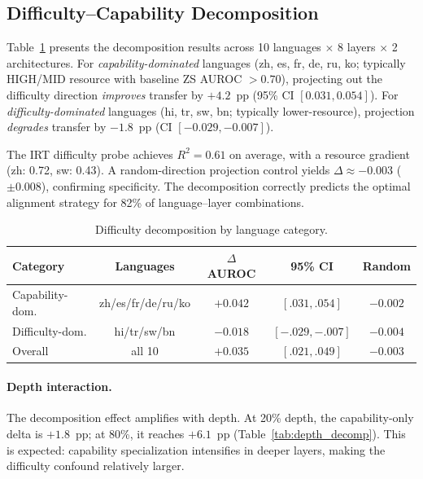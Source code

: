 \documentclass[11pt,a4paper]{article}
\begin{document}
\subsection{Difficulty--Capability Decomposition}
\label{sec:decomposition}

Table~\ref{tab:decomp} presents the decomposition results across 10 languages $\times$ 8 layers $\times$ 2 architectures.
For \emph{capability-dominated} languages (zh, es, fr, de, ru, ko; typically HIGH/MID resource with baseline ZS AUROC $> 0.70$), projecting out the difficulty direction \emph{improves} transfer by $+4.2$~pp (95\% CI $[0.031, 0.054]$).
For \emph{difficulty-dominated} languages (hi, tr, sw, bn; typically lower-resource), projection \emph{degrades} transfer by $-1.8$~pp (CI $[-0.029, -0.007]$).

The IRT difficulty probe achieves $R^2 = 0.61$ on average, with a resource gradient (zh: 0.72, sw: 0.43).
A random-direction projection control yields $\Delta \approx -0.003$ ($\pm 0.008$), confirming specificity.
The decomposition correctly predicts the optimal alignment strategy for 82\% of language--layer combinations.

\begin{table}[t]
\centering
\caption{Difficulty decomposition by language category.}
\label{tab:decomp}
\small
\begin{tabular}{lcccc}
\toprule
\textbf{Category} & \textbf{Languages} & \textbf{$\Delta$ AUROC} & \textbf{95\% CI} & \textbf{Random} \\
\midrule
Capability-dom. & zh/es/fr/de/ru/ko & $+0.042$ & $[.031, .054]$ & $-0.002$ \\
Difficulty-dom. & hi/tr/sw/bn       & $-0.018$ & $[-.029, -.007]$ & $-0.004$ \\
Overall         & all 10            & $+0.035$ & $[.021, .049]$ & $-0.003$ \\
\bottomrule
\end{tabular}
\end{table}

\paragraph{Depth interaction.}
The decomposition effect amplifies with depth.
At 20\% depth, the capability-only delta is $+1.8$~pp; at 80\%, it reaches $+6.1$~pp (Table~\ref{tab:depth_decomp}).
This is expected: capability specialization intensifies in deeper layers, making the difficulty confound relatively larger.
\end{document}
